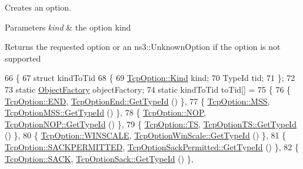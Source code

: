Creates an option. 


\begin{DoxyParams}{Parameters}
{\em kind} & the option kind \\
\hline
\end{DoxyParams}
\begin{DoxyReturn}{Returns}
the requested option or an ns3\+::\+Unknown\+Option if the option is not supported 
\end{DoxyReturn}

\begin{DoxyCode}
66 \{
67   \textcolor{keyword}{struct }kindToTid
68   \{
69     \hyperlink{classns3_1_1TcpOption_ab5fef728704d0ef8415899ca6af3efdd}{TcpOption::Kind} kind;
70     TypeId tid;
71   \};
72 
73   \textcolor{keyword}{static} \hyperlink{classns3_1_1Object_a2810e70b8c8377aa8617138fc0f65e92}{ObjectFactory} objectFactory;
74   \textcolor{keyword}{static} kindToTid toTid[] =
75   \{
76     \{ \hyperlink{classns3_1_1TcpOption_ab5fef728704d0ef8415899ca6af3efdda905203642bcd2c4a51a9dc346cd295a9}{TcpOption::END},           \hyperlink{classns3_1_1TcpOptionEnd_a668951e9dbe4134a81da13d584ee178c}{TcpOptionEnd::GetTypeId} () \},
77     \{ \hyperlink{classns3_1_1TcpOption_ab5fef728704d0ef8415899ca6af3efddaa927b89500f86a569307a272077bb747}{TcpOption::MSS},           \hyperlink{classns3_1_1TcpOptionMSS_aaec9dfb07153afa27d71d2deeda43f86}{TcpOptionMSS::GetTypeId} () \},
78     \{ \hyperlink{classns3_1_1TcpOption_ab5fef728704d0ef8415899ca6af3efdda710bbdc827237e9fc5cbe0781852acb9}{TcpOption::NOP},           \hyperlink{classns3_1_1TcpOptionNOP_a6c5e9984f11ad0f188680548eca459f6}{TcpOptionNOP::GetTypeId} () \},
79     \{ \hyperlink{classns3_1_1TcpOption_ab5fef728704d0ef8415899ca6af3efdda36327bb876e173f67d0881ecccc10bba}{TcpOption::TS},            \hyperlink{classns3_1_1TcpOptionTS_a54ce1501eb71df2e7a1b173b5449b923}{TcpOptionTS::GetTypeId} () \},
80     \{ \hyperlink{classns3_1_1TcpOption_ab5fef728704d0ef8415899ca6af3efddab982246aeba4e5c8a134da32317b44c0}{TcpOption::WINSCALE},      \hyperlink{classns3_1_1TcpOptionWinScale_ad332862562eccfa680baff8dc0f21e48}{TcpOptionWinScale::GetTypeId}
       () \},
81     \{ \hyperlink{classns3_1_1TcpOption_ab5fef728704d0ef8415899ca6af3efddab7c52885f2df3f09365bbb3781261a06}{TcpOption::SACKPERMITTED}, 
      \hyperlink{classns3_1_1TcpOptionSackPermitted_a55cbccf8eec5174166452008f625323e}{TcpOptionSackPermitted::GetTypeId} () \},
82     \{ \hyperlink{classns3_1_1TcpOption_ab5fef728704d0ef8415899ca6af3efdda15a723b4b912895242cef1595f19b0a2}{TcpOption::SACK},          \hyperlink{classns3_1_1TcpOptionSack_aeb9873e8c3994c962dec993f14fc12f0}{TcpOptionSack::GetTypeId} () \},

\end{DoxyCode}
